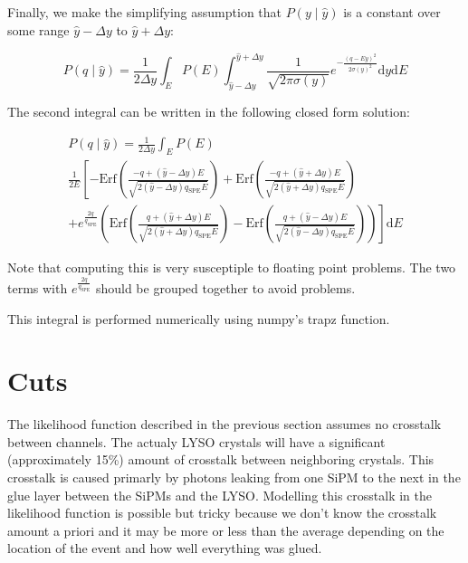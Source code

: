\documentclass[12pt,openright,twoside]{report}
\begin{document}
Finally, we make the simplifying assumption that $P(y\mid\hat{y})$ is a constant over some range $\hat{y} - \Delta y$ to $\hat{y} + \Delta y$:

\begin{equation}
P(q\mid \hat{y}) = \frac{1}{2 \Delta y}\int_E P(E) \int_{\hat{y} - \Delta y}^{\hat{y} + \Delta y} \frac{1}{\sqrt{2 \pi \sigma(y)}}e^{-\frac{(q-E y)^2}{2\sigma(y)^2}} \mathrm{d}y \mathrm{d}E
\end{equation}

The second integral can be written in the following closed form solution:

\begin{multline}
P(q\mid \hat{y}) = \frac{1}{2 \Delta y} \int_E P(E) \\
\frac{1}{2 E}\left[
-\mathrm{Erf}\left(\frac{-q+(\hat{y} - \Delta y) E}{\sqrt{2 (\hat{y} - \Delta y)q_\mathrm{SPE} E}}\right)
+\mathrm{Erf}\left(\frac{-q+(\hat{y} + \Delta y) E}{\sqrt{2 (\hat{y} + \Delta y)q_\mathrm{SPE} E}}\right) \right.\\
\left.+ e^{\frac{2 q}{q_\mathrm{SPE}}} \left(\mathrm{Erf}\left(\frac{q+(\hat{y} + \Delta y) E}{\sqrt{2 (\hat{y} + \Delta y)q_\mathrm{SPE} E}}\right)
- \mathrm{Erf}\left(\frac{q+(\hat{y} - \Delta y) E}{\sqrt{2 (\hat{y} - \Delta y)q_\mathrm{SPE} E}}\right) \right) \right] \mathrm{d}E
\end{multline}

Note that computing this is very susceptiple to floating point problems. The
two terms with $e^{\frac{2 q}{q_\mathrm{SPE}}}$ should be grouped together to
avoid problems.

This integral is performed numerically using numpy's trapz function.
\section{Cuts}
The likelihood function described in the previous section assumes no crosstalk
between channels. The actualy LYSO crystals will have a significant
(approximately 15\%) amount of crosstalk between neighboring crystals. This
crosstalk is caused primarly by photons leaking from one SiPM to the next in
the glue layer between the SiPMs and the LYSO. Modelling this crosstalk in the
likelihood function is possible but tricky because we don't know the crosstalk
amount a priori and it may be more or less than the average depending on the
location of the event and how well everything was glued.
\end{document}
